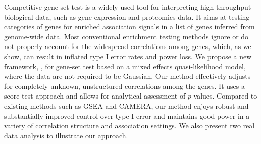 Competitive gene-set test is a widely used tool for interpreting high-throughput biological 
data, such as gene expression and proteomics data. It aims at testing categories of genes for 
enriched association signals in a list of genes inferred from genome-wide data. Most 
conventional enrichment testing methods ignore or do not properly account for the widespread 
correlations among genes, which, as we show, can result in inflated type I error rates and 
power loss. We propose a new framework, \OurMethod, for gene-set test based on a mixed effects 
quasi-likelihood model, where the data are not required to be Gaussian. Our method effectively 
adjusts for completely unknown,	unstructured correlations among the genes. It uses a score test 
approach and allows for analytical assessment of $p$-values. Compared to existing methods such 
as GSEA and CAMERA, our method enjoys robust and substantially improved control over type I 
error and maintains good power in a variety of correlation structure and association settings. 
We also present two real data analysis to illustrate our approach.
